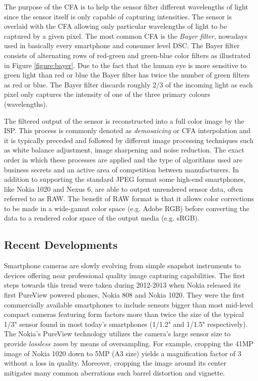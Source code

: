 \documentclass[thesis.tex]{subfiles}
\begin{document}
The purpose of the CFA is to help the sensor filter different wavelengths of light since the sensor itself is only capable of capturing intensities. The sensor is overlaid with the CFA allowing only particular wavelengths of light to be captured by a given pixel. The most common CFA is the \textit{Bayer filter}, nowadays used in basically every smartphone and consumer level DSC. The Bayer filter consists of alternating rows of red-green and green-blue color filters as illustrated in Figure \ref{figure:bayer}. Due to the fact that the human eye is more sensitive to green light than red or blue the Bayer filter has twice the number of green filters as red or blue. The Bayer filter discards roughly 2/3 of the incoming light as each pixel only captures the intensity of one of the three primary colours (wavelengths).

The filtered output of the sensor is reconstructed into a full color image by the ISP. This process is commonly denoted as \textit{demosaicing} or CFA interpolation and it is typically preceded and followed by different image processing techniques such as white balance adjustment, image sharpening and noise reduction. The exact order in which these processes are applied and the type of algorithms used are business secrets and an active area of competition between manufacturers. In addition to supporting the standard JPEG format some high-end smartphones, like Nokia 1020 and Nexus 6, are able to output unrendered sensor data, often referred to as RAW. The benefit of RAW format is that it allows color corrections to be made in a wide-gamut color space (e.g. Adobe RGB) before converting the data to a rendered color space of the output media (e.g. sRGB).

\subsection{Recent Developments}\label{chapter:solutions}

Smartphone cameras are slowly evolving from simple snapshot instruments to devices offering near professional quality image capturing capabilities. The first steps towards this trend were taken during 2012-2013 when Nokia released its first PureView powered phones, Nokia 808 and Nokia 1020. They were the first commercially available smartphones to include sensors bigger than most mid-level compact cameras featuring form factors more than twice the size of the typical 1/3" sensor found in most today's smartphones (1/1.2" and 1/1.5" respectively). The Nokia's PureView technology utilizes the camera's large sensor size to provide \textit{lossless zoom} by means of oversampling. For example, cropping the 41MP image of Nokia 1020 down to 5MP (A3 size) yields a magnification factor of 3 without a loss in quality. Moreover, cropping the image around its center mitigates many common aberrations such barrel distortion and vignette. \cite{lumia_1020}
\end{document}
